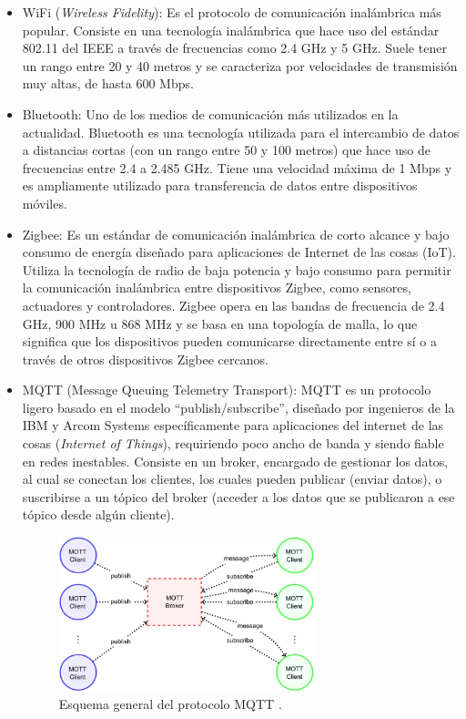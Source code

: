 \begin{itemize}
    \item WiFi (\textit{Wireless Fidelity}): Es el protocolo de comunicación inalámbrica más popular. Consiste en una tecnología inalámbrica que hace uso del estándar 802.11 del IEEE a través de frecuencias como 2.4 GHz y 5 GHz. Suele tener un rango entre 20 y 40 metros y se caracteriza por velocidades de transmisión muy altas, de hasta 600 Mbps.
    
    \item Bluetooth: Uno de los medios de comunicación más utilizados en la actualidad. Bluetooth es una tecnología utilizada para el intercambio de datos a distancias cortas (con un rango entre 50 y 100 metros) que hace uso de frecuencias entre 2.4 a 2.485 GHz. Tiene una velocidad máxima de 1 Mbps y es ampliamente utilizado para transferencia de datos entre dispositivos móviles.
    
    \item Zigbee: Es un estándar de comunicación inalámbrica de corto alcance y bajo consumo de energía diseñado para aplicaciones de Internet de las cosas (IoT). Utiliza la tecnología de radio de baja potencia y bajo consumo para permitir la comunicación inalámbrica entre dispositivos Zigbee, como sensores, actuadores y controladores. Zigbee opera en las bandas de frecuencia de 2.4 GHz, 900 MHz u 868 MHz y se basa en una topología de malla, lo que significa que los dispositivos pueden comunicarse directamente entre sí o a través de otros dispositivos Zigbee cercanos. 
    
    \item MQTT (Message Queuing Telemetry Transport): MQTT es un protocolo ligero basado en el modelo ``publish/subscribe'', diseñado por ingenieros de la IBM y Arcom Systems específicamente para aplicaciones del internet de las cosas (\textit{Internet of Things}), requiriendo poco ancho de banda y siendo fiable en redes inestables. Consiste en un broker, encargado de gestionar los datos, al cual se conectan los clientes, los cuales pueden publicar (enviar datos), o suscribirse a un tópico del broker (acceder a los datos que se publicaron a ese tópico desde algún cliente).
    
    \begin{figure}[H]
        \centering
        \includegraphics[width = 0.7\textwidth]{imagenes/cap1_marcoteo/MQTT-protocol-model.png}
        \caption{Esquema general del protocolo MQTT \citep{aloufi2020hybrid}.}
        \label{fig:mqtt}
    \end{figure}
    
\end{itemize}

